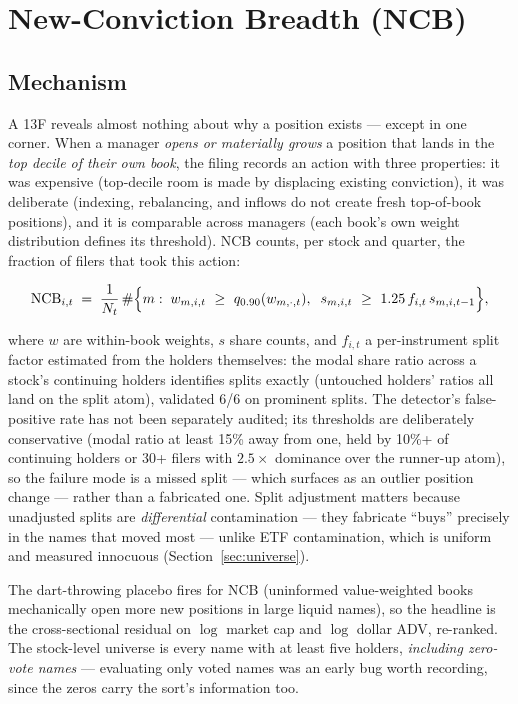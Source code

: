 \section{New-Conviction Breadth (NCB)}
\label{sec:ncb}

\subsection{Mechanism}

A 13F reveals almost nothing about why a position exists --- except
in one corner. When a manager \emph{opens or materially grows} a
position that lands in the \emph{top decile of their own book}, the
filing records an action with three properties: it was expensive
(top-decile room is made by displacing existing conviction), it was
deliberate (indexing, rebalancing, and inflows do not create fresh
top-of-book positions), and it is comparable across managers (each
book's own weight distribution defines its threshold). NCB counts,
per stock and quarter, the fraction of filers that took this action:

\[
\mathrm{NCB}_{i,t} \;=\; \frac{1}{N_t}\,\#\Bigl\{m :\;
w_{m,i,t}\ \ge\ q_{0.90}(w_{m,\cdot,t}),\;\;
s_{m,i,t}\ \ge\ 1.25\, f_{i,t}\, s_{m,i,t-1}\Bigr\},
\]

where $w$ are within-book weights, $s$ share counts, and $f_{i,t}$ a
per-instrument split factor estimated from the holders themselves:
the modal share ratio across a stock's continuing holders identifies
splits exactly (untouched holders' ratios all land on the split
atom), validated 6/6 on prominent splits. The detector's
false-positive rate has not been separately audited; its thresholds
are deliberately conservative (modal ratio at least 15\% away from
one, held by 10\%+ of continuing holders or 30+ filers with
$2.5\times$ dominance over the runner-up atom), so the failure mode
is a missed split --- which surfaces as an outlier position change
--- rather than a fabricated one. Split adjustment matters
because unadjusted splits are \emph{differential} contamination ---
they fabricate ``buys'' precisely in the names that moved most ---
unlike ETF contamination, which is uniform and measured innocuous
(Section~\ref{sec:universe}).

The dart-throwing placebo fires for NCB (uninformed value-weighted
books mechanically open more new positions in large liquid names), so
the headline is the cross-sectional residual on $\log$ market cap and
$\log$ dollar ADV, re-ranked. The stock-level universe is every name
with at least five holders, \emph{including zero-vote names} ---
evaluating only voted names was an early bug worth recording, since
the zeros carry the sort's information too.

